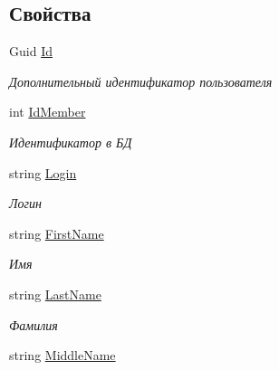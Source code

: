 \subsection*{Свойства}
\begin{DoxyCompactItemize}
\item 
Guid \hyperlink{class_security_1_1_model_1_1_user_a8dcf4cae272f56db4820050b3a0775dd}{Id}
\begin{DoxyCompactList}\small\item\em Дополнительный идентификатор пользователя \end{DoxyCompactList}\item 
int \hyperlink{class_security_1_1_model_1_1_user_a56ccf38956a09a81bd9b2d207b4acf16}{Id\+Member}
\begin{DoxyCompactList}\small\item\em Идентификатор в БД \end{DoxyCompactList}\item 
string \hyperlink{class_security_1_1_model_1_1_user_a0cbe52ac7db75e575d8fc87346ff468c}{Login}
\begin{DoxyCompactList}\small\item\em Логин \end{DoxyCompactList}\item 
string \hyperlink{class_security_1_1_model_1_1_user_a49adbbd9b80d69775935a4ecb6f6e313}{First\+Name}
\begin{DoxyCompactList}\small\item\em Имя \end{DoxyCompactList}\item 
string \hyperlink{class_security_1_1_model_1_1_user_a3451c387c2872396e9428f078fa3a0a2}{Last\+Name}
\begin{DoxyCompactList}\small\item\em Фамилия \end{DoxyCompactList}\item 
string \hyperlink{class_security_1_1_model_1_1_user_a10dae174b8f51cdc30c8e6ccc2aa2055}{Middle\+Name}

\end{DoxyCompactItemize}
